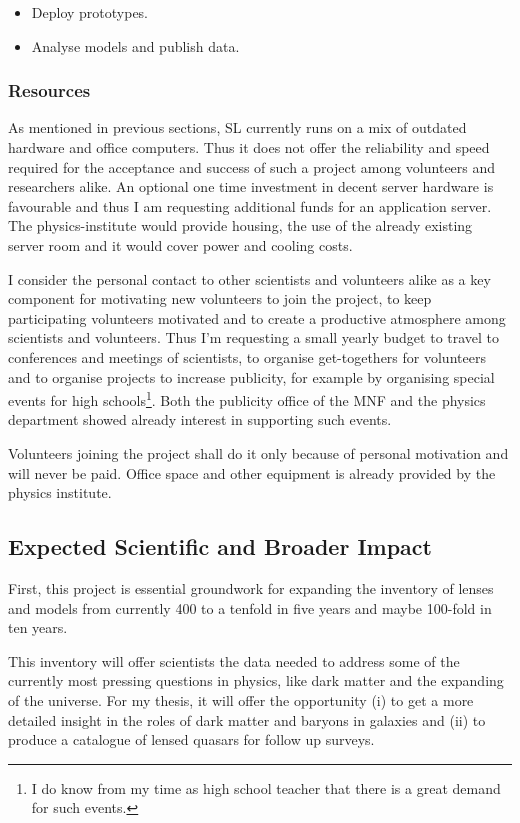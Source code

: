 \documentclass[11pt]{article}
\begin{document}
\begin{itemize}
  \item Deploy prototypes.
  \item Analyse models and publish data.
\end{itemize}


\subsubsection{Resources}

As mentioned in previous sections, SL currently runs on a mix of outdated hardware and office computers.
Thus it does not offer the reliability and speed required for the acceptance and success of such a project among volunteers and researchers alike.
An optional one time investment in decent server hardware is favourable and thus I am requesting additional funds for an application server.
The physics-institute would provide housing, the use of the already existing server room and it would cover power and cooling costs.

I consider the personal contact to other scientists and volunteers alike as a key component for motivating new volunteers to join the project, to keep participating volunteers motivated and to create a productive atmosphere among scientists and volunteers.
Thus I'm requesting a small yearly budget to travel to conferences and meetings of scientists, to organise get-togethers for volunteers and to organise projects to increase publicity, for example by organising special events for high schools\footnote{I do know from my time as high school teacher that there is a great demand for such events.}. Both the publicity office of the MNF and the physics department showed already interest in supporting such events.

Volunteers joining the project shall do it only because of personal motivation and will never be paid.
Office space and other equipment is already provided by the physics institute.




\subsection{Expected Scientific and Broader Impact}

First, this project is essential groundwork for expanding the inventory of lenses and models from currently 400 to a tenfold in five years and maybe 100-fold in ten years.

This inventory will offer scientists the data needed to address some of the currently most pressing questions in physics, like dark matter and the expanding of the universe.
For my thesis, it will offer the opportunity (i) to get a more detailed insight in the roles of dark matter and baryons in galaxies and (ii) to produce a catalogue of lensed quasars for follow up surveys.
\end{document}
